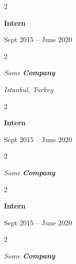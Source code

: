 \documentclass[10pt, letterpaper]{article}
\newenvironment{twocolentry}[2][]{
    \onecolentry
    \def\secondColumn{#2}
    \setcolumnwidth{\fill, 4.5 cm}
    \begin{paracol}{2}
}{
    \switchcolumn \raggedleft \secondColumn
    \end{paracol}
    \endonecolentry
} %
\begin{document}
        \vspace{0.2 cm}

                \begin{twocolentry}{
                    Sept 2015 – June 2020
                }
                \textbf{Intern}
                \end{twocolentry}
            \begin{twocolentry}{
        \textit{Istanbul, Turkey}    }
            \textit{Some \textbf{Company}}
            \end{twocolentry}



        \vspace{0.2 cm}

                \begin{twocolentry}{
                    Sept 2015 – June 2020
                }
                \textbf{Intern}
                \end{twocolentry}
            \begin{twocolentry}{
            }
            \textit{Some \textbf{Company}}
            \end{twocolentry}



        \vspace{0.2 cm}

                \begin{twocolentry}{
                    Sept 2015 – June 2020
                }
                \textbf{Intern}
                \end{twocolentry}
            \begin{twocolentry}{
            }
            \textit{Some \textbf{Company}}
            \end{twocolentry}
\end{document}
